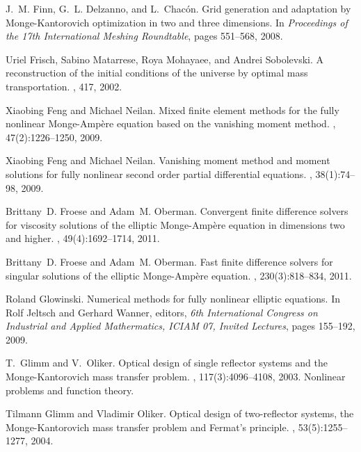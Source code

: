 \documentclass{amsart}
\theoremstyle{lemma}
\theoremstyle{remark}
\begin{document}
\begin{thebibliography}{CKKSE97}
J.~M. Finn, G.~L. Delzanno, and L.~Chac{\'o}n.
\newblock Grid generation and adaptation by {M}onge-{K}antorovich optimization
  in two and three dimensions.
\newblock In {\em Proceedings of the 17th International Meshing Roundtable},
  pages 551--568, 2008.

Uriel Frisch, Sabino Matarrese, Roya Mohayaee, and Andrei Sobolevski.
\newblock A reconstruction of the initial conditions of the universe by optimal
  mass transportation.
, 417, 2002.

Xiaobing Feng and Michael Neilan.
\newblock Mixed finite element methods for the fully nonlinear
  {M}onge-{A}mp\`ere equation based on the vanishing moment method.
, 47(2):1226--1250, 2009.

Xiaobing Feng and Michael Neilan.
\newblock Vanishing moment method and moment solutions for fully nonlinear
  second order partial differential equations.
, 38(1):74--98, 2009.

Brittany~D. Froese and Adam~M. Oberman.
\newblock Convergent finite difference solvers for viscosity solutions of the
  elliptic {M}onge-{A}mp\`ere equation in dimensions two and higher.
, 49(4):1692--1714, 2011.

Brittany~D. Froese and Adam~M. Oberman.
\newblock Fast finite difference solvers for singular solutions of the elliptic
  {M}onge-{A}mp\`ere equation.
, 230(3):818--834, 2011.

Roland Glowinski.
\newblock Numerical methods for fully nonlinear elliptic equations.
\newblock In Rolf Jeltsch and Gerhard Wanner, editors, {\em 6th International
  Congress on Industrial and Applied Mathermatics, ICIAM 07, Invited Lectures},
  pages 155--192, 2009.

T.~Glimm and V.~Oliker.
\newblock Optical design of single reflector systems and the
  {M}onge-{K}antorovich mass transfer problem.
, 117(3):4096--4108, 2003.
\newblock Nonlinear problems and function theory.

Tilmann Glimm and Vladimir Oliker.
\newblock Optical design of two-reflector systems, the {M}onge-{K}antorovich
  mass transfer problem and {F}ermat's principle.
, 53(5):1255--1277, 2004.


\end{thebibliography}
\end{document}
